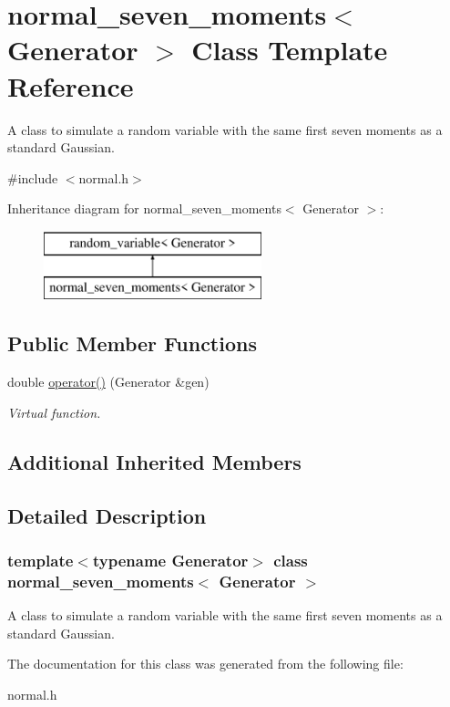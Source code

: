 \hypertarget{classnormal__seven__moments}{}\section{normal\+\_\+seven\+\_\+moments$<$ Generator $>$ Class Template Reference}
\label{classnormal__seven__moments}


A class to simulate a random variable with the same first seven moments as a standard Gaussian.  




{\ttfamily \#include $<$normal.\+h$>$}

Inheritance diagram for normal\+\_\+seven\+\_\+moments$<$ Generator $>$\+:\begin{figure}[H]
\begin{center}
\leavevmode
\includegraphics[height=2.000000cm]{classnormal__seven__moments}
\end{center}
\end{figure}
\subsection*{Public Member Functions}
\begin{DoxyCompactItemize}
\item 
\mbox{\label{classnormal__seven__moments_a45d2d30b82cd449a4e3e2d9fe266b786}} 
double \mbox{\hyperlink{classnormal__seven__moments_a45d2d30b82cd449a4e3e2d9fe266b786}{operator()}} (Generator \&gen)
\begin{DoxyCompactList}\small\item\em Virtual function. \end{DoxyCompactList}\end{DoxyCompactItemize}
\subsection*{Additional Inherited Members}


\subsection{Detailed Description}
\subsubsection*{template$<$typename Generator$>$\newline
class normal\+\_\+seven\+\_\+moments$<$ Generator $>$}

A class to simulate a random variable with the same first seven moments as a standard Gaussian. 

The documentation for this class was generated from the following file\+:\begin{DoxyCompactItemize}
\item 
normal.\+h\end{DoxyCompactItemize}
